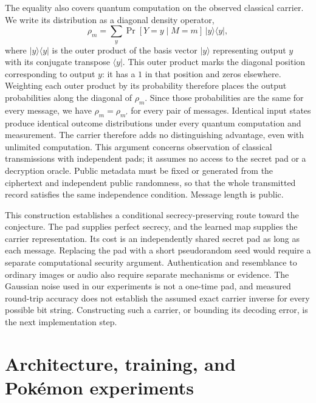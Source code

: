 \documentclass[10pt]{article}
\begin{document}
The equality also covers quantum computation on the observed classical carrier.
We write its distribution as a diagonal density operator,
\begin{equation}
 \rho_m=\sum_y\Pr[Y=y\mid M=m]\,|y\rangle\langle y|,
\end{equation}
where $|y\rangle\langle y|$ is the outer product of the basis vector
$|y\rangle$ representing output $y$ with its conjugate transpose $\langle y|$.
This outer product marks the diagonal position corresponding to output $y$:
it has a $1$ in that position and zeros elsewhere. Weighting each outer product
by its probability therefore places the output probabilities along the diagonal
of $\rho_m$. Since those probabilities are the same for every message,
we have $\rho_m=\rho_{m'}$ for every pair of messages. Identical input states
produce identical outcome distributions under every quantum computation and
measurement. The carrier therefore adds no distinguishing advantage, even with
unlimited computation. This argument concerns observation of classical
transmissions with independent pads; it assumes no access to the secret pad
or a decryption oracle. Public metadata must be fixed or generated from the
ciphertext and independent public randomness, so that the whole transmitted
record satisfies the same independence condition. Message length is public.

This construction establishes a conditional secrecy-preserving route toward
the conjecture. The pad supplies perfect secrecy, and the learned map supplies
the carrier representation. Its cost is an independently shared secret pad as
long as each message. Replacing the pad with a short pseudorandom seed would
require a separate computational security argument. Authentication and resemblance
to ordinary images or audio also require separate mechanisms or evidence.
The Gaussian noise used in our experiments is not a one-time pad, and measured
round-trip accuracy does not establish the assumed exact carrier inverse for
every possible bit string. Constructing such a carrier, or bounding its decoding
error, is the next implementation step.

\section{Architecture, training, and Pok\'emon experiments}
\end{document}
